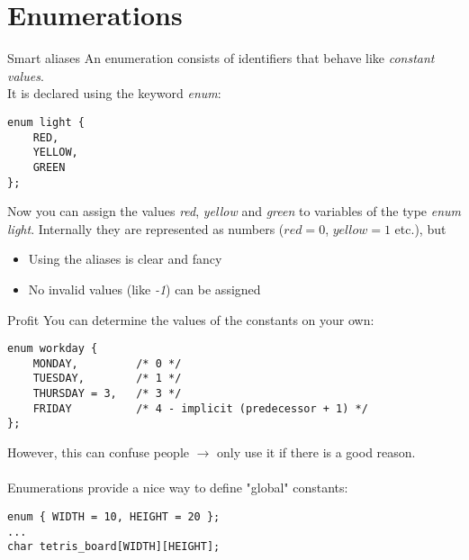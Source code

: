 \section{Enumerations}

\begin{frame}[fragile]{Smart aliases}
	An enumeration consists of identifiers that behave like \textit{constant values}. \\
	It is declared using the keyword \textit{enum}:
	\begin{lstlisting}[numbers=none]
enum light {
	RED,
	YELLOW,
	GREEN
};    \end{lstlisting}
	Now you can assign the values \textit{red}, \textit{yellow} and \textit{green} to variables of the type \textit{enum light}. Internally they are represented as numbers ($red = 0$, $yellow = 1$ etc.), but
	\begin{itemize}
		\item Using the aliases is clear and fancy
		\item No invalid values (like \textit{-1}) can be assigned
	\end{itemize}
\end{frame}


\begin{frame}[fragile]{Profit}
	You can determine the values of the constants on your own:
	\begin{lstlisting}[numbers=none]
enum workday {
	MONDAY,			/* 0 */
	TUESDAY,		/* 1 */
	THURSDAY = 3,	/* 3 */
	FRIDAY			/* 4 - implicit (predecessor + 1) */
};\end{lstlisting}
	However, this can confuse people $\rightarrow$ only use it if there is a good reason. \\ \ \\
	Enumerations provide a nice way to define "global" constants:
	\begin{lstlisting}[numbers=none]
enum { WIDTH = 10, HEIGHT = 20 };
...
char tetris_board[WIDTH][HEIGHT];
\end{lstlisting}
\end{frame}

